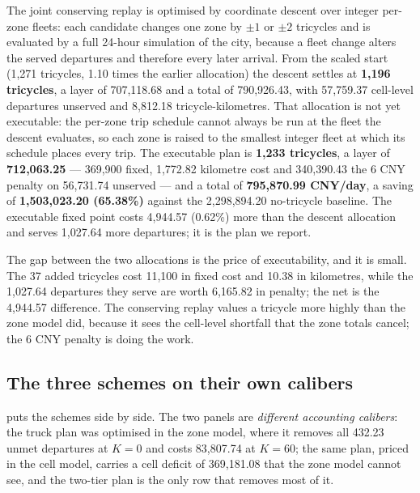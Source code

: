 The joint conserving replay is optimised by coordinate descent over integer per-zone
fleets: each candidate changes one zone by $\pm1$ or $\pm2$ tricycles and is evaluated
by a full 24-hour simulation of the city, because a fleet change alters the served
departures and therefore every later arrival. From the scaled start (1,271 tricycles,
1.10 times the earlier allocation) the descent settles
at \textbf{1,196 tricycles}, a layer of 707,118.68 and a total of 790,926.43, with
57,759.37 cell-level departures unserved and 8,812.18 tricycle-kilometres. That
allocation is not yet executable: the per-zone trip schedule cannot always be run at the
fleet the descent evaluates, so each zone is raised to the smallest integer fleet at which
its schedule places every trip. The executable plan is \textbf{1,233 tricycles}, a layer
of \textbf{712,063.25} --- 369,900 fixed, 1,772.82 kilometre cost and 340,390.43 the 6 CNY
penalty on 56,731.74 unserved --- and a total of \textbf{795,870.99 CNY/day}, a saving of
\textbf{1,503,023.20 (65.38\%)} against the 2,298,894.20 no-tricycle baseline. The
executable fixed point costs 4,944.57 (0.62\%) more than the descent allocation and
serves 1,027.64 more departures; it is the plan we report.

The gap between the two allocations is the price of executability, and it is small. The
37 added tricycles cost 11,100 in fixed cost and 10.38 in kilometres, while the
1,027.64 departures they serve are worth 6,165.82 in penalty; the net is the
4,944.57 difference. The conserving replay values a tricycle more highly than the zone
model did, because it sees the cell-level shortfall that the zone totals cancel; the
6 CNY penalty is doing the work.

\subsection{The three schemes on their own calibers}

 puts the schemes side by side. The two panels are
\emph{different accounting calibers}: the truck plan was optimised in the zone model,
where it removes all 432.23 unmet departures at $K=0$ and costs 83,807.74 at $K=60$;
the same plan, priced in the cell model, carries a cell deficit of 369,181.08 that the
zone model cannot see, and the two-tier plan is the only row that removes most of it.

